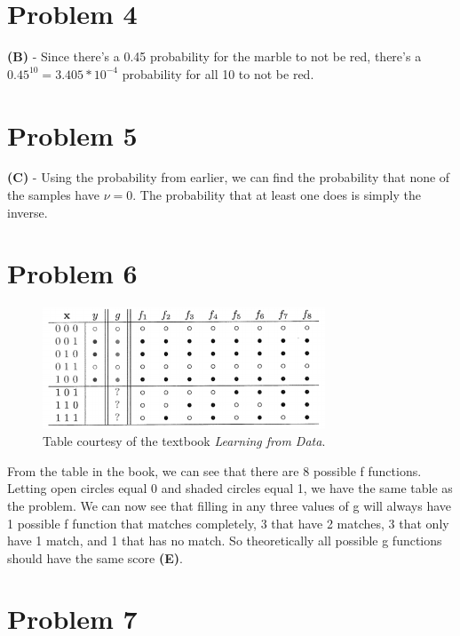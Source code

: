 \documentclass[10pt,letter]{article}
\begin{document}
\section*{Problem 4}

\textbf{(B)} - Since there's a 0.45 probability for the marble to not be red, there's a $0.45^{10} = 3.405 * 10^{-4}$ probability for all 10 to not be red.

\section*{Problem 5}

\textbf{(C)} - Using the probability from earlier, we can find the probability that none of the samples have $\nu = 0$. The probability that at least one does is simply the inverse.

\section*{Problem 6}

\begin{figure}[H]
\begin{center}
\includegraphics[width=0.75\textwidth]{FactorTable.PNG}
\caption{Table courtesy of the textbook \textit{Learning from Data}.}
\label{FactorTable}
\end{center}
\end{figure}

From the table in the book, we can see that there are 8 possible  f functions. Letting open circles equal 0 and shaded circles equal 1, we have the same table as the problem. We can now see that filling in any three values of g will always have 1 possible f function that matches completely, 3 that have 2 matches, 3 that only have 1 match, and 1 that has no match. So theoretically all possible g functions should have the same score \textbf{(E)}.

\section*{Problem 7}
\end{document}
